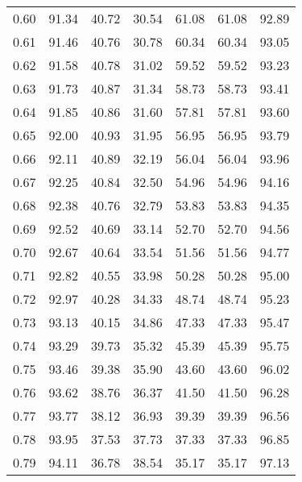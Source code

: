 \begin{tabular}{|c|c|c|c|c|c|c|}
      0.60 &     91.34 &     40.72 &      30.54 &   61.08 &      61.08 &         92.89 \\
      0.61 &     91.46 &     40.76 &      30.78 &   60.34 &      60.34 &         93.05 \\
      0.62 &     91.58 &     40.78 &      31.02 &   59.52 &      59.52 &         93.23 \\
      0.63 &     91.73 &     40.87 &      31.34 &   58.73 &      58.73 &         93.41 \\
      0.64 &     91.85 &     40.86 &      31.60 &   57.81 &      57.81 &         93.60 \\
      0.65 &     92.00 &     40.93 &      31.95 &   56.95 &      56.95 &         93.79 \\
      0.66 &     92.11 &     40.89 &      32.19 &   56.04 &      56.04 &         93.96 \\
      0.67 &     92.25 &     40.84 &      32.50 &   54.96 &      54.96 &         94.16 \\
      0.68 &     92.38 &     40.76 &      32.79 &   53.83 &      53.83 &         94.35 \\
      0.69 &     92.52 &     40.69 &      33.14 &   52.70 &      52.70 &         94.56 \\
      0.70 &     92.67 &     40.64 &      33.54 &   51.56 &      51.56 &         94.77 \\
      0.71 &     92.82 &     40.55 &      33.98 &   50.28 &      50.28 &         95.00 \\
      0.72 &     92.97 &     40.28 &      34.33 &   48.74 &      48.74 &         95.23 \\
      0.73 &     93.13 &     40.15 &      34.86 &   47.33 &      47.33 &         95.47 \\
      0.74 &     93.29 &     39.73 &      35.32 &   45.39 &      45.39 &         95.75 \\
      0.75 &     93.46 &     39.38 &      35.90 &   43.60 &      43.60 &         96.02 \\
      0.76 &     93.62 &     38.76 &      36.37 &   41.50 &      41.50 &         96.28 \\
      0.77 &     93.77 &     38.12 &      36.93 &   39.39 &      39.39 &         96.56 \\
      0.78 &     93.95 &     37.53 &      37.73 &   37.33 &      37.33 &         96.85 \\
      0.79 &     94.11 &     36.78 &      38.54 &   35.17 &      35.17 &         97.13 \\

\end{tabular}
